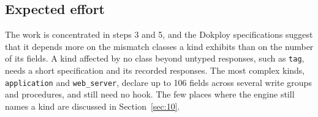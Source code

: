 \subsection{Expected effort}\label{sec:8.4}

The work is concentrated in steps 3 and 5, and the Dokploy specifications suggest that it depends more
on the mismatch classes a kind exhibits than on the number of its fields. A kind affected by no class
beyond untyped responses, such as \texttt{tag}, needs a short specification and its recorded responses. The
most complex kinds, \texttt{application} and \texttt{web\_server}, declare up to 106 fields across several write
groups and procedures, and still need no hook. The few places where the engine still names a kind are
discussed in Section~\ref{sec:10}.
